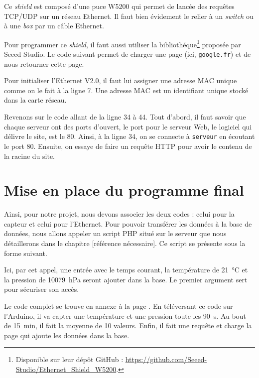 Ce \emph{shield} est composé d'une puce W5200 qui permet de lancée des requêtes TCP/UDP sur un réseau Ethernet. Il faut bien évidement le relier à un \emph{switch} ou à une \emph{box} par un câble Ethernet.

Pour programmer ce \emph{shield}, il faut aussi utiliser la bibliothéque\footnote{Disponible sur leur dépôt GitHub : \url{https://github.com/Seeed-Studio/Ethernet_Shield_W5200}.} proposée par Seeed Studio. Le code suivant permet de charger une page (ici, \verb-google.fr-) et de nous retourner cette page.


Pour initialiser l'Ethernet V2.0, il faut lui assigner une adresse MAC unique comme on le fait à la ligne 7. Une adresse MAC est un identifiant unique stocké dans la carte réseau.

Revenons sur le code allant de la ligne 34 à 44. Tout d'abord, il faut savoir que chaque serveur ont des ports d'ouvert, le port pour le serveur Web, le logiciel qui délivre le site, est le 80. Ainsi, à la ligne 34, on se connecte à \verb-serveur- en écoutant le port 80. Ensuite, on essaye de faire un requête HTTP pour avoir le contenu de la racine du site.

\section{Mise en place du programme final}

Ainsi, pour notre projet, nous devons associer les deux codes : celui pour la capteur et celui pour l'Ethernet. Pour pouvoir transférer les données à la base de données, nous allons appeler un script PHP situé sur le serveur que nous détaillerons dans le chapitre [référence nécessaire]. Ce script se présente sous la forme suivant.


Ici, par cet appel, une entrée avec le temps courant, la température de \SI{21}{\celsius} et la pression de \SI{10079}{\hecto\pascal} seront ajouter dans la base. Le premier argument sert pour sécuriser son accès.

\Espace

Le code complet se trouve en annexe à la page \pageref{code:arduino}. En téléversant ce code sur l'Arduino, il va capter une température et une pression toute les \SI{90}{\second}. Au bout de \SI{15}{\minute}, il fait la moyenne de 10 valeurs. Enfin, il fait une requête et charge la page qui ajoute les données dans la base.
